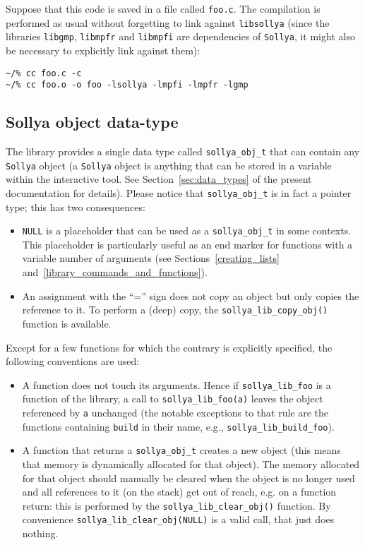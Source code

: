 \documentclass[a4paper]{article}
\newcommand{\sollya}{\texttt{Sollya}\xspace}
\begin{document}
Suppose that this code is saved in a file called \texttt{foo.c}. The compilation is performed as usual without forgetting to link against \texttt{libsollya} (since the libraries \texttt{libgmp}, \texttt{libmpfr} and \texttt{libmpfi} are dependencies of \sollya, it might also be necessary to explicitly link against them):
\begin{center}\begin{minipage}{15cm}\begin{Verbatim}[frame=single]
~/% cc foo.c -c
~/% cc foo.o -o foo -lsollya -lmpfi -lmpfr -lgmp
\end{Verbatim}
\end{minipage}\end{center}

 \subsection{Sollya object data-type}
The library provides a single data type called \texttt{sollya\_obj\_t} that can contain any \sollya object (a \sollya object is anything that can be stored in a variable within the interactive tool. See Section~\ref{sec:data_types} of the present documentation for details). Please notice that \texttt{sollya\_obj\_t} is in fact a pointer type; this has two consequences:
\begin{itemize}
\item \texttt{NULL} is a placeholder that can be used as a \texttt{sollya\_obj\_t} in some contexts. This placeholder is particularly useful as an end marker for functions with a variable number of arguments (see Sections~\ref{creating_lists} and~\ref{library_commands_and_functions}).
\item An assignment with the ``='' sign does not copy an object but only copies the reference to it. To perform a (deep) copy, the \texttt{sollya\_lib\_copy\_obj()} function is available.
\end{itemize}
Except for a few functions for which the contrary is explicitly specified, the following conventions are used:
\begin{itemize}
\item  A function does not touch its arguments. Hence if \texttt{sollya\_lib\_foo} is a function of the library, a call to \texttt{sollya\_lib\_foo(a)} leaves the object referenced by \texttt{a} unchanged (the notable exceptions to that rule are the functions containing \verb|build| in their name, e.g., \texttt{sollya\_lib\_build\_foo}).
\item A function that returns a \texttt{sollya\_obj\_t} creates a new object (this means that memory is dynamically allocated for that object). The memory allocated for that object should manually be cleared when the object is no longer used and all references to it (on the stack) get out of reach, e.g. on a function return: this is performed by the \texttt{sollya\_lib\_clear\_obj()} function. By convenience \verb|sollya_lib_clear_obj(NULL)| is a valid call, that just does nothing.
\end{itemize}
\end{document}
